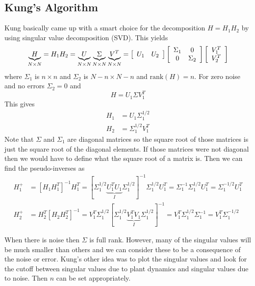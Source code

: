 \documentclass[lecture,12pt,]{pcms-l}
\theoremstyle{example}
\begin{document}
\subsection{Kung's Algorithm}
Kung basically came up with a smart choice for the decomposition $H=H_1H_2$ by using singular value decomposition (SVD). This yields
$$\underbrace{H}_{N\times N} = H_1H_2 = \underbrace{U}_{N\times N} \underbrace{\Sigma}_{N\times N} \underbrace{V^T}_{N\times N} = \left[\begin{array}{c c} U_1 & U_2 \end{array}\right] \left[\begin{array}{c c} \Sigma_1 & 0 \\ 0 & \Sigma_2 \end{array}\right] \left[\begin{array}{c} V_1^T \\ V_2^T \end{array}\right]$$
where $\Sigma_1$ is $n\times n$ and $\Sigma_2$ is $N-n\times N-n$ and $\text{rank}(H)=n$. For zero noise and no errors $\Sigma_2=0$ and
$$H=U_1\Sigma V_1^T$$
This gives
\begin{align*}
H_1 &= U_1\Sigma_1^{1/2} \\
H_2 &= \Sigma_1^{1/2}V_1^T
\end{align*}
Note that $\Sigma$ and $\Sigma_1$ are diagonal matrices so the square root of those matrices is just the square root of the diagonal elements. If those matrices were not diagonal then we would have to define what the square root of a matrix is. Then we can find the pseudo-inverses as
\begin{align*}
H_1^+ &= [H_1H_1^T]^{-1}H_1^T = [\Sigma_1^{1/2}\underbrace{U_1^TU_1}_{I}\Sigma_1^{1/2}]^{-1}\Sigma_1^{1/2}U_1^T = \Sigma_1^{-1}\Sigma_1^{1/2}U_1^T = \Sigma_1^{-1/2}U_1^T \\
H_2^+ &= H_2^T[H_2H_2^T]^{-1} = V_1^T\Sigma_1^{1/2}[\Sigma_1^{1/2}\underbrace{V_1^TV_1}_{I}\Sigma_1^{1/2}]^{-1} = V_1^T\Sigma_1^{1/2}\Sigma_1^{-1} = V_1^T\Sigma_1^{-1/2}
\end{align*}

When there is noise then $\Sigma$ is full rank. However, many of the singular values will be much smaller than others and we can consider these to be a consequence of the noise or error. Kung's other idea was to plot the singular values and look for the cutoff between singular values due to plant dynamics and singular values due to noise. Then $n$ can be set appropriately.
\end{document}
